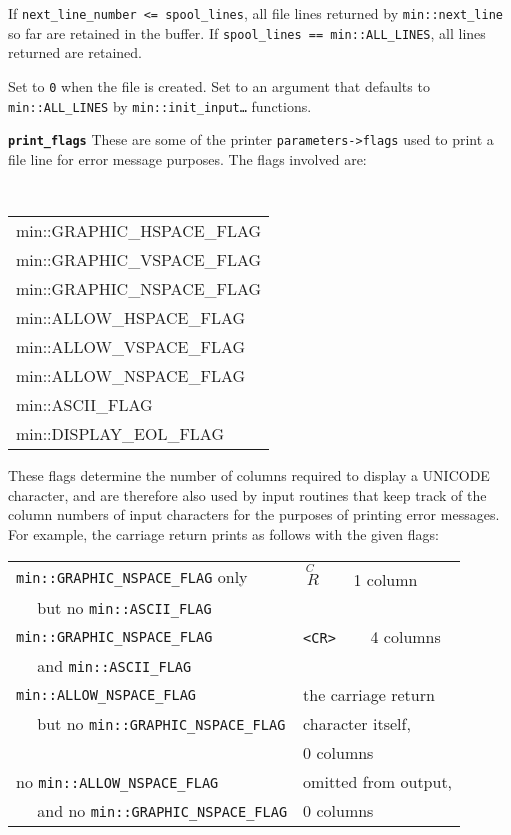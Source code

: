 \documentclass[12pt]{article}
\makeatletter
\newcommand{\ttmkey}[2]{{\tt \bf #1}\index{#1@{\tt #1}!#2}}
\newcommand{\EOL}{\penalty \exhyphenpenalty}
\newenvironment{indpar}[1][0.3in]%
	{\begin{list}{}%
		     {\setlength{\itemsep}{0in}%
		      \setlength{\topsep}{0in}%
		      \setlength{\parsep}{1ex}%
		      \setlength{\labelwidth}{#1}%
		      \setlength{\leftmargin}{#1}%
		      \addtolength{\leftmargin}{\labelsep}}%
	 \item}%
	{\end{list}}
\newenvironment{itemlist}[1][1.2in]%
	{\begin{list}{}{\setlength{\labelwidth}{#1}%
		        \setlength{\leftmargin}{\labelwidth}%
		        \addtolength{\leftmargin}{+0.2in}%
		        \renewcommand{\makelabel}[1]{##1\hfill}}}%
	{\end{list}}
\makeatother
\begin{document}
\begin{itemlist}[1.4in]
If {\tt next\_line\_number~<=~spool\_lines}, all file lines
returned by {\tt min::\EOL next\_\EOL line} so far are
retained in the buffer.
If {\tt spool\_\EOL lines == min::\EOL ALL\_\EOL LINES},
all lines returned are retained.

Set to {\tt 0} when the file is created.  Set to an argument
that defaults to {\tt min::\EOL ALL\_\EOL LINES}
by {\tt min::\EOL init\_\EOL input\ldots} functions.

\item[\ttmkey{print\_\EOL flags}{in {\tt min::file}}]
These are some of the printer {\tt parameters->\EOL flags} used to print
a file line for error message purposes.  The flags involved are:
\begin{indpar}
\tt
\begin{tabular}{l}
min::GRAPHIC\_HSPACE\_FLAG \\
min::GRAPHIC\_VSPACE\_FLAG \\
min::GRAPHIC\_NSPACE\_FLAG \\
min::ALLOW\_HSPACE\_FLAG \\
min::ALLOW\_VSPACE\_FLAG \\
min::ALLOW\_NSPACE\_FLAG \\
min::ASCII\_FLAG \\
min::DISPLAY\_EOL\_FLAG
\end{tabular}
\end{indpar}

These flags determine the number of columns required to display a
UNICODE character, and are therefore also used by input routines
that keep track of the column numbers of input characters for
the purposes of printing error messages.  For example, the carriage
return prints as follows with the given flags:
\begin{center}
\begin{tabular}{l@{~~~~}l}
{\tt min::GRAPHIC\_NSPACE\_FLAG} only
	& {\tiny $\stackrel{\textstyle C~}{~R}$} ~~~ 1 column \\
~~ but no {\tt min::ASCII\_FLAG}
\\[1ex]
{\tt min::GRAPHIC\_NSPACE\_FLAG} & {\tt <CR>} ~~~ 4 columns \\
~~ and {\tt min::ASCII\_FLAG}
\\[1ex]
{\tt min::ALLOW\_NSPACE\_FLAG}   & the carriage return \\
~~ but no {\tt min::GRAPHIC\_NSPACE\_FLAG} & character itself, \\
					   & 0 columns
\\[1ex]
no {\tt min::ALLOW\_NSPACE\_FLAG}   & omitted from output, \\
~~ and no {\tt min::GRAPHIC\_NSPACE\_FLAG}  & 0 columns
\end{tabular}
\end{center}


\end{itemlist}
\end{document}
